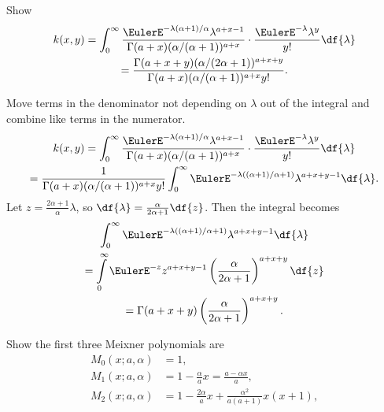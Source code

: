 \documentclass[12pt]{article}
\begin{document}
\begin{exercise}
    Show
    \begin{multline*}
        k(x,y) = \int_0^{\infty} \frac{\EulerE^{-\lambda(\alpha+1)/\alpha}
        \lambda^{a+x-1}}{\Gamma(a + x)(\alpha/(\alpha+1))^{a+x}} \cdot
        \frac{\EulerE^{-\lambda} \lambda^y}{y!} \df{\lambda} \\
        = \frac{\Gamma(a+x+y)(\alpha/(2\alpha+1))^{a+x+y}}{\Gamma(a+x) (\alpha/
        (\alpha+1))^{a+x}y!}.
    \end{multline*}
\end{exercise}
\begin{solution}
    Move terms in the denominator not depending on \( \lambda \) out of
    the integral and combine like terms in the numerator.
    \begin{multline*}
        k(x,y) = \int_0^{\infty} \frac{\EulerE^{-\lambda(\alpha+1)/\alpha}
        \lambda^{a+x-1}}{\Gamma(a + x)(\alpha/(\alpha+1))^{a+x}} \cdot
        \frac{\EulerE^{-\lambda} \lambda^y}{y!} \df{\lambda} \\
        = \frac{1}{\Gamma(a + x)(\alpha/(\alpha+1))^{a+x} y!} \int_0^{\infty}
        \EulerE^{-\lambda((\alpha+1)/\alpha + 1)} \lambda^{a+x+y-1} \df{\lambda}.
    \end{multline*}
    Let \( z = \frac{2\alpha+1}{\alpha} \lambda \), so \( \df{\lambda} =
    \frac{\alpha}{2\alpha+1} \df{z} \).  Then the integral becomes
    \begin{multline*}
        \int_0^{\infty} \EulerE^{-\lambda((\alpha+1)/\alpha + 1)}
        \lambda^ {a+x+y-1} \df{\lambda} \\
        = \int\limits_0^{\infty}\EulerE^{-z} z^{a + x + y -1} \left(
        \frac{\alpha}{2\alpha+1} \right)^{a + x +y} \df{z} \\
        = \Gamma(a + x + y) \left( \frac{\alpha}{2\alpha+1} \right)^{a +
        x +y}.
    \end{multline*}
\end{solution}
\begin{exercise}
    Show the first three Meixner polynomials are
    \begin{align*}
        M_0(x; a,\alpha) &= 1, \\
        M_1(x; a,\alpha) &= 1 - \frac{\alpha}{a}x = \frac{a - \alpha x}{a},\\
        M_2(x; a,\alpha) &= 1 - \frac{2\alpha}{a}x + \frac{\alpha^2}{a(a+1)}x
        (x+1),
    \end{align*}
\end{exercise}
\end{document}
